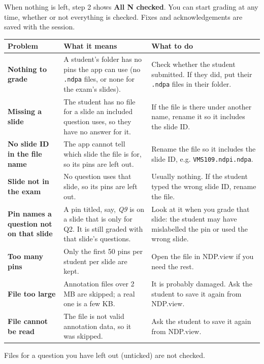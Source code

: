When nothing is left, step 2 shows \textbf{\checksym{} All N checked}. You can start grading at any time, whether or not everything is checked. Fixes and acknowledgements are saved with the session.

\begingroup\renewcommand{\arraystretch}{1.35}
\noindent\begin{tabularx}{\linewidth}{YYY}
\toprule
\textbf{Problem} & \textbf{What it means} & \textbf{What to do} \\
\midrule
\textbf{Nothing to grade} & A student's folder has no pins the app can use (no \texttt{.ndpa} files, or none for the exam's slides). & Check whether the student submitted. If they did, put their \texttt{.ndpa} files in their folder. \\
\textbf{Missing a slide} & The student has no file for a slide an included question uses, so they have no answer for it. & If the file is there under another name, rename it so it includes the slide ID. \\
\textbf{No slide ID in the file name} & The app cannot tell which slide the file is for, so its pins are left out. & Rename the file so it includes the slide ID, e.g. \texttt{VMS109.ndpi.ndpa}. \\
\textbf{Slide not in the exam} & No question uses that slide, so its pins are left out. & Usually nothing. If the student typed the wrong slide ID, rename the file. \\
\textbf{Pin names a question not on that slide} & A pin titled, say, \emph{Q9} is on a slide that is only for Q2. It is still graded with that slide's questions. & Look at it when you grade that slide: the student may have mislabelled the pin or used the wrong slide. \\
\textbf{Too many pins} & Only the first 50 pins per student per slide are kept. & Open the file in NDP.view if you need the rest. \\
\textbf{File too large} & Annotation files over 2 MB are skipped; a real one is a few KB. & It is probably damaged. Ask the student to save it again from NDP.view. \\
\textbf{File cannot be read} & The file is not valid annotation data, so it was skipped. & Ask the student to save it again from NDP.view. \\
\bottomrule
\end{tabularx}\endgroup\par\medskip

Files for a question you have left out (unticked) are not checked.

